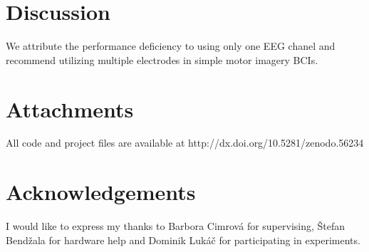 \documentclass[a1,portrait]{sciposter}
\def\mysection#1{
{\color{sectionCol}\section*{\sc\bfseries #1}}}
\begin{document}
\begin{multicols*}{3}
\mysection{Discussion}
We attribute the performance deficiency to using only one EEG chanel and recommend utilizing multiple electrodes in simple motor imagery BCIs.

\mysection{Attachments}
All code and project files are available at http://dx.doi.org/10.5281/zenodo.56234

\mysection{Acknowledgements}

I would like to express my thanks to Barbora Cimrová for supervising, Štefan Bendžala for hardware help and Dominik Lukáč for participating in experiments.

\begin{small}
{\small}

\end{small}

\end{multicols*}
\end{document}
